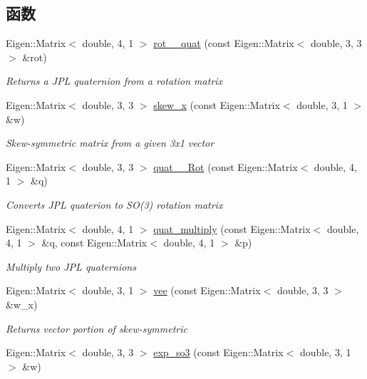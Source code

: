\subsection*{函数}
\begin{DoxyCompactItemize}
\item 
Eigen\+::\+Matrix$<$ double, 4, 1 $>$ \hyperlink{namespaceov__core_a1d2aafa6a756bb70fcd9f52695b4e573}{rot\+\_\+\_\+quat} (const Eigen\+::\+Matrix$<$ double, 3, 3 $>$ \&rot)
\begin{DoxyCompactList}\small\item\em Returns a J\+PL quaternion from a rotation matrix \end{DoxyCompactList}\item 
Eigen\+::\+Matrix$<$ double, 3, 3 $>$ \hyperlink{namespaceov__core_a24012c54df35621a935655b2e230169d}{skew\+\_\+x} (const Eigen\+::\+Matrix$<$ double, 3, 1 $>$ \&w)
\begin{DoxyCompactList}\small\item\em Skew-\/symmetric matrix from a given 3x1 vector \end{DoxyCompactList}\item 
Eigen\+::\+Matrix$<$ double, 3, 3 $>$ \hyperlink{namespaceov__core_adfb06397034cc6b346efb9517ed3757e}{quat\+\_\+\_\+\+Rot} (const Eigen\+::\+Matrix$<$ double, 4, 1 $>$ \&q)
\begin{DoxyCompactList}\small\item\em Converts J\+PL quaterion to S\+O(3) rotation matrix \end{DoxyCompactList}\item 
Eigen\+::\+Matrix$<$ double, 4, 1 $>$ \hyperlink{namespaceov__core_aa708e95617ccac1c880451014f2715fa}{quat\+\_\+multiply} (const Eigen\+::\+Matrix$<$ double, 4, 1 $>$ \&q, const Eigen\+::\+Matrix$<$ double, 4, 1 $>$ \&p)
\begin{DoxyCompactList}\small\item\em Multiply two J\+PL quaternions \end{DoxyCompactList}\item 
Eigen\+::\+Matrix$<$ double, 3, 1 $>$ \hyperlink{namespaceov__core_aaf2593d3bde63e31ac9fc20e345271dc}{vee} (const Eigen\+::\+Matrix$<$ double, 3, 3 $>$ \&w\+\_\+x)
\begin{DoxyCompactList}\small\item\em Returns vector portion of skew-\/symmetric \end{DoxyCompactList}\item 
Eigen\+::\+Matrix$<$ double, 3, 3 $>$ \hyperlink{namespaceov__core_a835a207e29f0e50ddbf66d8ddce47514}{exp\+\_\+so3} (const Eigen\+::\+Matrix$<$ double, 3, 1 $>$ \&w)

\end{DoxyCompactItemize}
